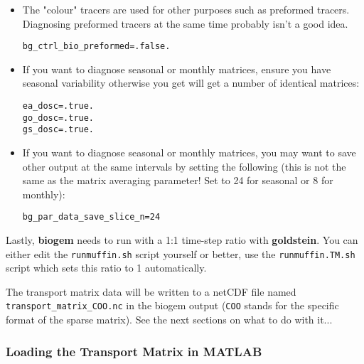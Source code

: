 \begin{itemize}
\vspace{1mm}
\item The "colour" tracers are used for other purposes such as preformed tracers. Diagnosing preformed tracers at the same time probably isn't a good idea.
\vspace{-1mm}\small\begin{verbatim}
bg_ctrl_bio_preformed=.false.
\end{verbatim}\normalsize\vspace{-1mm}
\item If you want to diagnose seasonal or monthly matrices, ensure you have seasonal variability otherwise you get will get a number of identical matrices:
\vspace{-1mm}\small\begin{verbatim}
ea_dosc=.true.
go_dosc=.true.
gs_dosc=.true.
\end{verbatim}\normalsize\vspace{-1mm}
\item If you want to diagnose seasonal or monthly matrices, you may want to save other output at the same intervals by setting the following (this is not the same as the matrix averaging parameter! Set to 24 for seasonal or 8 for monthly):
\vspace{-1mm}\small\begin{verbatim}
bg_par_data_save_slice_n=24
\end{verbatim}\normalsize\vspace{-1mm}
\end{itemize}

\noindent Lastly, \textbf{biogem} needs to run with a 1:1 time-step ratio with \textbf{goldstein}. You can either edit the \texttt{runmuffin.sh} script yourself or better, use the \texttt{runmuffin.TM.sh} script which sets this ratio to 1 automatically.

The transport matrix data will be written to a netCDF file named \texttt{transport\_matrix\_COO.nc} in the biogem output (\texttt{COO} stands for the specific format of the sparse matrix). See the next sections on what to do with it...


\subsubsection{Loading the Transport Matrix in MATLAB}

